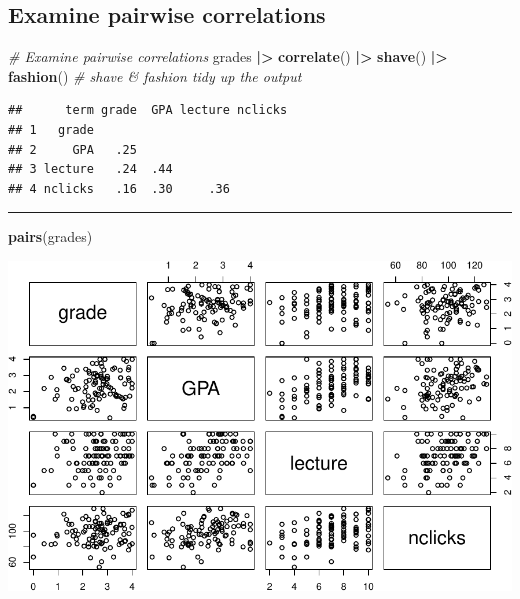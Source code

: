 \documentclass[
]{article}
\newenvironment{Shaded}{\begin{snugshade}}{\end{snugshade}}
\newcommand{\CommentTok}[1]{\textcolor[rgb]{0.56,0.35,0.01}{\textit{#1}}}
\newcommand{\FunctionTok}[1]{\textcolor[rgb]{0.13,0.29,0.53}{\textbf{#1}}}
\newcommand{\NormalTok}[1]{#1}
\newcommand{\SpecialCharTok}[1]{\textcolor[rgb]{0.81,0.36,0.00}{\textbf{#1}}}
\begin{document}
\hypertarget{examine-pairwise-correlations}{%
\subsection{Examine pairwise
correlations}\label{examine-pairwise-correlations}}

\begin{Shaded}
\begin{Highlighting}[]
\CommentTok{\# Examine pairwise correlations}
\NormalTok{grades }\SpecialCharTok{|\textgreater{}}
  \FunctionTok{correlate}\NormalTok{() }\SpecialCharTok{|\textgreater{}}
  \FunctionTok{shave}\NormalTok{() }\SpecialCharTok{|\textgreater{}} 
  \FunctionTok{fashion}\NormalTok{() }\CommentTok{\# shave \& fashion tidy up the output}
\end{Highlighting}
\end{Shaded}

\begin{verbatim}
##      term grade  GPA lecture nclicks
## 1   grade                           
## 2     GPA   .25                     
## 3 lecture   .24  .44                
## 4 nclicks   .16  .30     .36
\end{verbatim}

\begin{center}\rule{0.5\linewidth}{0.5pt}\end{center}

\begin{Shaded}
\begin{Highlighting}[]
\FunctionTok{pairs}\NormalTok{(grades)}
\end{Highlighting}
\end{Shaded}

\includegraphics{L8_Multiple_regression_pdf_files/figure-latex/unnamed-chunk-4-1.pdf}
\end{document}
